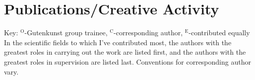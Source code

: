 \documentclass[11pt]{article}
\begin{document}
    
\newcommand{\trainee}{$^\mathrm{O}$}
\newcommand{\corresponding}{$^\mathrm{C}$\xspace}
\newcommand{\equal}{$^\mathrm{E}$}
\newcommand{\grad}{}

\section*{Publications/Creative Activity}
Key: \trainee-Gutenkunst group trainee, \corresponding-corresponding author, \equal-contributed equally\\%
In the scientific fields to which I've contributed most, the authors with the greatest roles in carrying out the work are listed first, and the authors with the greatest roles in supervision are listed last. Conventions for corresponding author vary.
\end{document}
